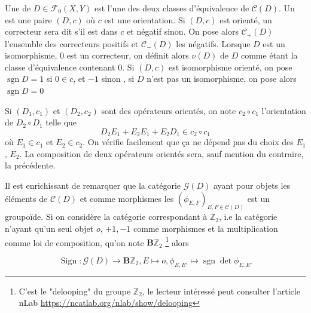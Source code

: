 \documentclass[memoire.tex]{subfiles}
\begin{document}
\begin{definition}
    Une  de $D\in\mathcal{F}_0(X,Y)$ est l'une des deux classes d'équivalence de $\mathcal{C}(D)$. Un  est une paire $(D,c)$ où $c$ est une orientation. Si $(D,c)$ est orienté, un correcteur sera dit  s'il est dans $c$ et négatif sinon. On pose alors $\mathcal{C}_{+}(D)$ l'ensemble des correcteurs positifs et $\mathcal{C}_{-}(D)$ les négatifs. Lorsque $D$ est un isomorphisme, $0$ est un correcteur, on définit alors  $\nu(D)$ de $D$ comme étant la classe d'équivalence contenant $0$. Si $(D,c)$ est isomorphisme orienté, on pose $\operatorname{sgn}D=1$ si $0\in c $, et $-1$ sinon , si $D$ n'est pas un isomorphisme, on pose alors $\operatorname{sgn}D=0$
\end{definition}
\begin{definition}
    Si $(D_1,c_1)$ et $(D_2,c_2)$ sont des opérateurs orientés, on note $c_2\circ c_1$ l'orientation de $D_2\circ D_1$ telle que
    \begin{equation*}
        D_2E_1+ E_2E_1+ E_2D_1\in  c_2\circ c_1
    \end{equation*}
    où $E_1\in c_1$ et $E_2\in c_2$. On vérifie 
    facilement que ça ne dépend pas du choix des 
    $E_1$, $E_2$. La composition de deux opérateurs 
    orientés sera, sauf mention du contraire, 
    la précédente. 
\end{definition}

Il est enrichissant de remarquer 
que la catégorie $\mathcal{G}(D)$ 
ayant pour objets les éléments de 
$\mathcal{C}(D)$ et comme 
morphismes les $(\phi_{E,F})_{E,F\in\mathcal{C}(D)}$ est un groupoïde. Si on considère la catégorie correspondant à $\mathbb{Z}_2$, i.e la catégorie n'ayant qu'un seul objet $o$, $+1,-1$ comme morphismes et la multiplication comme loi de composition, qu'on note $\mathbf{B}\mathbb{Z}_2$
\footnote{C'est le "delooping" du groupe $\mathbb{Z}_2$, le lecteur intéressé peut consulter l'article nLab \url{ https://ncatlab.org/nlab/show/delooping} }
alors 

\begin{equation*}
    \operatorname*{Sign}: \mathcal{G}(D)\rightarrow \mathbf{B}\mathbb{Z}_2, E\mapsto o, \phi_{E,E'}\mapsto \operatorname*{sgn}\det \phi_{E,E'}
\end{equation*}
\end{document}
